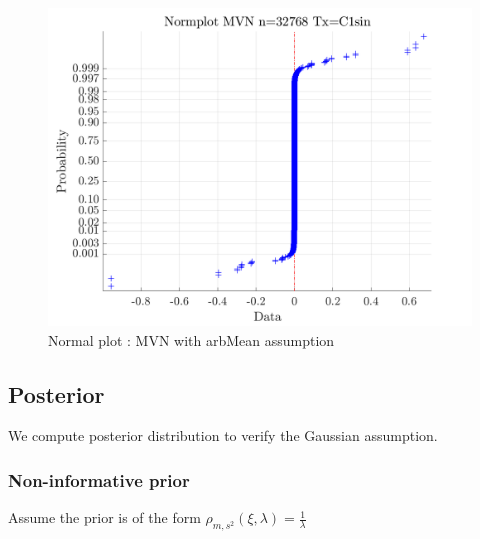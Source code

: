 \documentclass{svjour3}                     %
\begin{document}
\begin{figure}[ht]
	\centering
	\includegraphics[width=0.9\linewidth]{"figures/MVN Normplot d_2 bernoulli_2 Period_C1sin n_32768"}
	\caption{Normal plot : MVN with arbMean assumption}
	\label{fig:mvn-normplot}
\end{figure}
\fi
















\subsection{Posterior} We compute posterior distribution to verify the Gaussian assumption.

\subsubsection{Non-informative prior}
Assume the prior is of the form $ \rho_{m,s^2} (\xi, \lambda) = \frac{1}{\lambda} $ 
\end{document}
